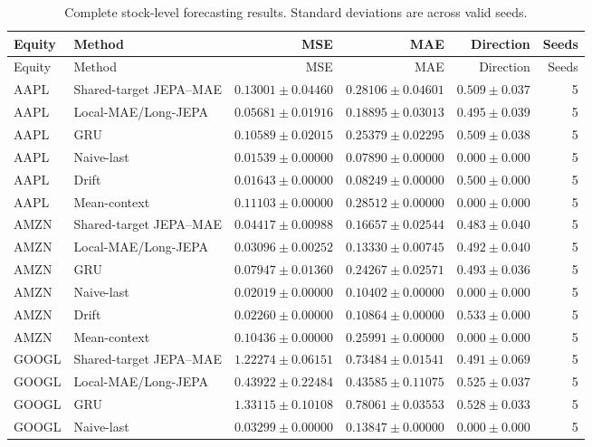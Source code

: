 \begin{longtable}{llrrrr}
\caption{Complete stock-level forecasting results. Standard deviations are across valid seeds.}\label{tab:appendix_stock_metrics}\\
\toprule
Equity & Method & MSE & MAE & Direction & Seeds \\
\midrule
\endfirsthead
\toprule
Equity & Method & MSE & MAE & Direction & Seeds \\
\midrule
\endhead
AAPL & Shared-target JEPA--MAE & $0.13001 \pm 0.04460$ & $0.28106 \pm 0.04601$ & $0.509 \pm 0.037$ & 5 \\
AAPL & Local-MAE/Long-JEPA & $0.05681 \pm 0.01916$ & $0.18895 \pm 0.03013$ & $0.495 \pm 0.039$ & 5 \\
AAPL & GRU & $0.10589 \pm 0.02015$ & $0.25379 \pm 0.02295$ & $0.509 \pm 0.038$ & 5 \\
AAPL & Naive-last & $0.01539 \pm 0.00000$ & $0.07890 \pm 0.00000$ & $0.000 \pm 0.000$ & 5 \\
AAPL & Drift & $0.01643 \pm 0.00000$ & $0.08249 \pm 0.00000$ & $0.500 \pm 0.000$ & 5 \\
AAPL & Mean-context & $0.11103 \pm 0.00000$ & $0.28512 \pm 0.00000$ & $0.000 \pm 0.000$ & 5 \\
AMZN & Shared-target JEPA--MAE & $0.04417 \pm 0.00988$ & $0.16657 \pm 0.02544$ & $0.483 \pm 0.040$ & 5 \\
AMZN & Local-MAE/Long-JEPA & $0.03096 \pm 0.00252$ & $0.13330 \pm 0.00745$ & $0.492 \pm 0.040$ & 5 \\
AMZN & GRU & $0.07947 \pm 0.01360$ & $0.24267 \pm 0.02571$ & $0.493 \pm 0.036$ & 5 \\
AMZN & Naive-last & $0.02019 \pm 0.00000$ & $0.10402 \pm 0.00000$ & $0.000 \pm 0.000$ & 5 \\
AMZN & Drift & $0.02260 \pm 0.00000$ & $0.10864 \pm 0.00000$ & $0.533 \pm 0.000$ & 5 \\
AMZN & Mean-context & $0.10436 \pm 0.00000$ & $0.25991 \pm 0.00000$ & $0.000 \pm 0.000$ & 5 \\
GOOGL & Shared-target JEPA--MAE & $1.22274 \pm 0.06151$ & $0.73484 \pm 0.01541$ & $0.491 \pm 0.069$ & 5 \\
GOOGL & Local-MAE/Long-JEPA & $0.43922 \pm 0.22484$ & $0.43585 \pm 0.11075$ & $0.525 \pm 0.037$ & 5 \\
GOOGL & GRU & $1.33115 \pm 0.10108$ & $0.78061 \pm 0.03553$ & $0.528 \pm 0.033$ & 5 \\
GOOGL & Naive-last & $0.03299 \pm 0.00000$ & $0.13847 \pm 0.00000$ & $0.000 \pm 0.000$ & 5 \\

\end{longtable}
